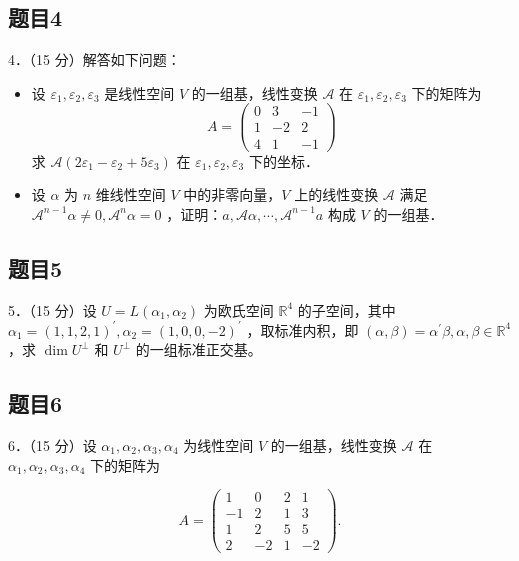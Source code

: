 \documentclass{article}
\begin{document}
\subsection{题目4}
4．（15 分）解答如下问题：

\begin{itemize}
  \item[（1）] 设 \(\varepsilon_{1}, \varepsilon_{2}, \varepsilon_{3}\) 是线性空间 \(V\) 的一组基，线性变换 \(\mathcal{A}\) 在 \(\varepsilon_{1}, \varepsilon_{2}, \varepsilon_{3}\) 下的矩阵为
\[
A=\left(\begin{array}{ccc}
0 & 3 & -1 \\
1 & -2 & 2 \\
4 & 1 & -1
\end{array}\right)
\]
求 \(\mathcal{A}\left(2 \varepsilon_{1}-\varepsilon_{2}+5 \varepsilon_{3}\right)\) 在 \(\varepsilon_{1}, \varepsilon_{2}, \varepsilon_{3}\) 下的坐标．
  \item[（2）] 设 \(\alpha\) 为 \(n\) 维线性空间 \(V\) 中的非零向量，\(V\) 上的线性变换 \(\mathcal{A}\) 满足 \(\mathcal{A}^{n-1} \alpha \neq 0, \mathcal{A}^{n} \alpha=0\) ，证明：\(a, \mathcal{A} \alpha, \cdots, \mathcal{A}^{n-1} a\) 构成 \(V\) 的一组基．
\end{itemize}

\subsection{题目5}
5．（15 分）设 \(U=L\left(\alpha_{1}, \alpha_{2}\right)\) 为欧氏空间 \(\mathbb{R}^{4}\) 的子空间，其中 \(\alpha_{1}=(1,1,2,1)^{\prime}, \alpha_{2}=(1,0,0,-2)^{\prime}\) ，取标准内积，即 \((\alpha, \beta)=\alpha^{\prime} \beta, \alpha, \beta \in \mathbb{R}^{4}\) ，求 \(\operatorname{dim} U^{\perp}\) 和 \(U^{\perp}\) 的一组标准正交基。

\subsection{题目6}
6．（15 分）设 \(\alpha_{1}, \alpha_{2}, \alpha_{3}, \alpha_{4}\) 为线性空间 \(V\) 的一组基，线性变换 \(\mathcal{A}\) 在 \(\alpha_{1}, \alpha_{2}, \alpha_{3}, \alpha_{4}\) 下的矩阵为

\[
A=\left(\begin{array}{cccc}
1 & 0 & 2 & 1 \\
-1 & 2 & 1 & 3 \\
1 & 2 & 5 & 5 \\
2 & -2 & 1 & -2
\end{array}\right) .
\]
\end{document}
